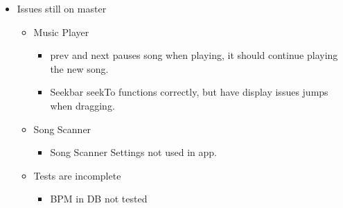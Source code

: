 \begin{itemize}
\item Issues still on master
	\begin{itemize}
	\item Music Player
		\begin{itemize}
		\item prev and next pauses song when playing, it should continue playing the new song.
		\item Seekbar seekTo functions correctly, but have display issues jumps when dragging.
		\end{itemize}
	\end{itemize}
	\begin{itemize}
	\item Song Scanner
		\begin{itemize}
		\item Song Scanner Settings not used in app.
		\end{itemize}
	\end{itemize}
	\begin{itemize}
	\item Tests are incomplete
		\begin{itemize}
		\item BPM in DB not tested
		\end{itemize}
	\end{itemize}
\end{itemize}
